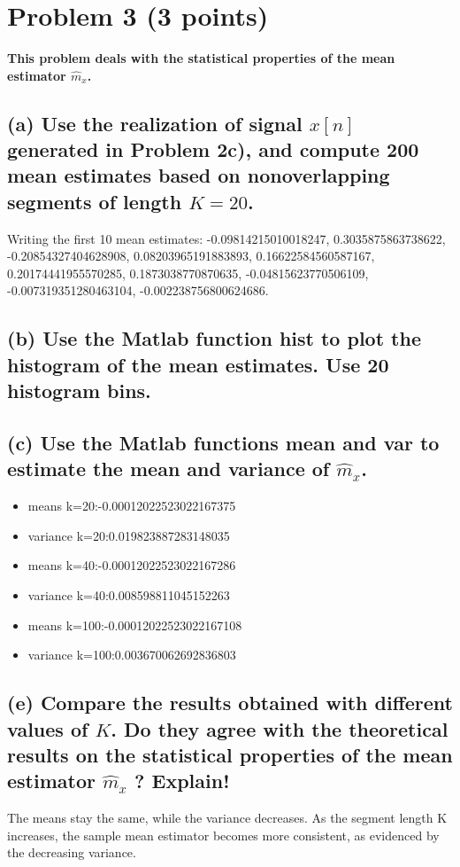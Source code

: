 \section{Problem 3 (3 points)}
\textbf{This problem deals with the statistical properties of the mean estimator $\hat{m}_x$.}
\subsection*{(a) Use the realization of signal $x[n]$ generated in Problem 2c), and compute 200 mean estimates based on nonoverlapping segments of length $K=20$.}
Writing the first 10 mean estimates:
-0.09814215010018247, 0.3035875863738622, -0.20854327404628908, 0.08203965191883893, 0.16622584560587167, 0.20174441955570285, 0.1873038770870635, -0.04815623770506109, -0.007319351280463104, -0.002238756800624686.
\subsection*{(b) Use the Matlab function hist to plot the histogram of the mean estimates. Use 20 histogram bins.}
\subsection*{(c) Use the Matlab functions mean and var to estimate the mean and variance of $\hat{m}_x$.}
\begin{itemize}
    \item means k=20:-0.00012022523022167375
    \item variance k=20:0.019823887283148035
    \item means k=40:-0.00012022523022167286
    \item variance k=40:0.008598811045152263
    \item means k=100:-0.00012022523022167108
    \item variance k=100:0.003670062692836803
\end{itemize}

\subsection*{(e) Compare the results obtained with different values of $K$. Do they agree with the theoretical results on the statistical properties of the mean estimator $\hat{m}_x$ ? Explain!}
The means stay the same, while the variance decreases. As the segment length K increases, the sample mean estimator becomes more consistent, as evidenced by the decreasing variance.